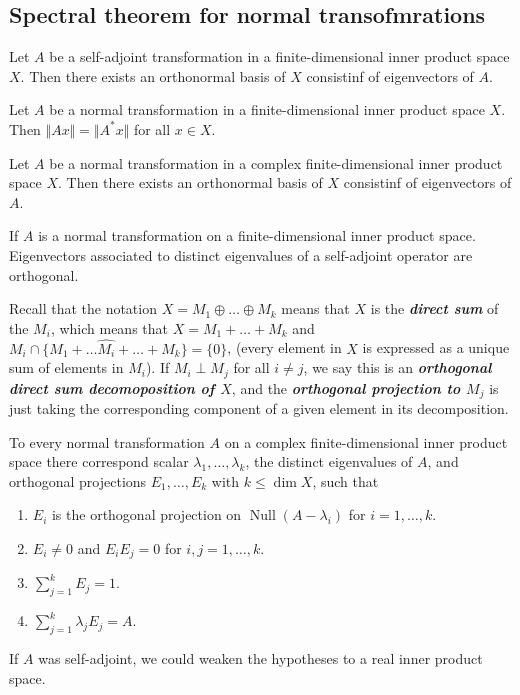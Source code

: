 \documentclass{article}
\theoremstyle{definition}
\begin{document}
	\subsection{Spectral theorem for normal transofmrations}
	\begin{thm}
		Let $A$ be a self-adjoint transformation in a finite-dimensional inner product space $X$. Then there exists an orthonormal basis of $X$ consistinf of eigenvectors of $A$.
	\end{thm}
	\begin{lemma}
		Let $A$ be a normal transformation in a finite-dimensional inner product space $X$. Then $\Vert Ax\Vert=\Vert A^*x\Vert$ for all $x\in X$.
	\end{lemma}
	\begin{thm}
		Let $A$ be a normal transformation in a complex finite-dimensional inner product space $X$. Then there exists an orthonormal basis of $X$ consistinf of eigenvectors of $A$.
	\end{thm}
	\begin{thm}
		If $A$ is a normal transformation on a finite-dimensional inner product space. Eigenvectors associated to distinct eigenvalues of a self-adjoint operator are orthogonal.
	\end{thm}
	Recall that the notation $X=M_1\oplus\ldots\oplus M_k$ means that $X$ is the \textbf{\textit{direct sum}} of the $M_i$, which means that $X=M_1+\ldots+M_k$ and $M_i\cap\{M_1+\ldots \hat{M_i}+\ldots+M_k\}=\{0\}$, (every element in $X$ is expressed as a unique sum of elements in $M_i$). If $M_i\perp M_j$ for all $i\neq j$, we say this is an \textbf{\textit{orthogonal direct sum decomoposition of $X$}}, and the \textbf{\textit{orthogonal projection to $M_j$}} is just taking the corresponding component of a given element in its decomposition.
	\begin{thm}
		To every normal transformation $A$ on a complex finite-dimensional inner product space there correspond scalar $\lambda_1,\ldots,\lambda_k$, the distinct eigenvalues of $A$, and orthogonal projections $E_1,\ldots,E_k$ with $k\leq \dim X$, such that
		\begin{enumerate}
			\item $E_i$ is the orthogonal projection on $\operatorname{Null}(A-\lambda_i)$ for $i=1,\ldots,k$.
			\item $E_i\neq0$ and $E_iE_j=0$ for $i,j=1,\ldots,k$.
			\item $\sum_{j=1}^kE_j=1$.
			\item $\sum_{j=1}^k\lambda_jE_j=A$.
		\end{enumerate}
	\end{thm}
	If $A$ was self-adjoint, we could weaken the hypotheses to a real inner product space.
\end{document}
